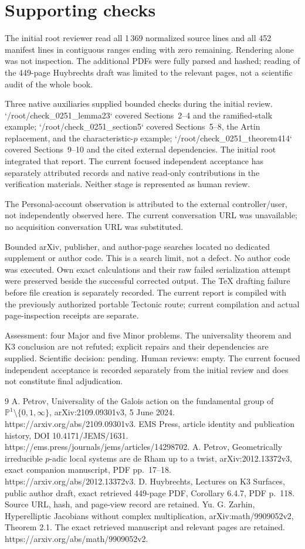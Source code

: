 \documentclass[10pt]{article}
\begin{document}
\section*{Supporting checks}
The initial root reviewer read all 1 369 normalized source lines and all 452 manifest lines in contiguous ranges ending with zero remaining. Rendering alone was not inspection. The additional PDFs were fully parsed and hashed; reading of the 449-page Huybrechts draft was limited to the relevant pages, not a scientific audit of the whole book.\par
Three native auxiliaries supplied bounded checks during the initial review. `/root/check\_0251\_lemma23` covered Sections 2–4 and the ramified-stalk example; `/root/check\_0251\_section5` covered Sections 5–8, the Artin replacement, and the characteristic-\(p\) example; `/root/check\_0251\_theorem414` covered Sections 9–10 and the cited external dependencies. The initial root integrated that report. The current focused independent acceptance has separately attributed records and native read-only contributions in the verification materials. Neither stage is represented as human review.\par
The Personal-account observation is attributed to the external controller/user, not independently observed here. The current conversation URL was unavailable; no acquisition conversation URL was substituted.\par
Bounded arXiv, publisher, and author-page searches located no dedicated supplement or author code. This is a search limit, not a defect. No author code was executed. Own exact calculations and their raw failed serialization attempt were preserved beside the successful corrected output. The TeX drafting failure before file creation is separately recorded. The current report is compiled with the previously authorized portable Tectonic route; current compilation and actual page-inspection receipts are separate.\par
Assessment: four Major and five Minor problems. The universality theorem and K3 conclusion are not refuted; explicit repairs and their dependencies are supplied. Scientific decision: pending. Human reviews: empty. The current focused independent acceptance is recorded separately from the initial review and does not constitute final adjudication.\par
9 A. Petrov, Universality of the Galois action on the fundamental group of \(\mathbb P^1\setminus\{0,1,\infty\}\), arXiv:2109.09301v3, 5 June 2024. https://arxiv.org/abs/2109.09301v3. EMS Press, article identity and publication history, DOI 10.4171/JEMS/1631. https://ems.press/journals/jems/articles/14298702. A. Petrov, Geometrically irreducible \(p\)-adic local systems are de Rham up to a twist, arXiv:2012.13372v3, exact companion manuscript, PDF pp. 17–18. https://arxiv.org/abs/2012.13372v3. D. Huybrechts, Lectures on K3 Surfaces, public author draft, exact retrieved 449-page PDF, Corollary 6.4.7, PDF p. 118. Source URL, hash, and page-view record are retained. Yu. G. Zarhin, Hyperelliptic Jacobians without complex multiplication, arXiv:math/9909052v2, Theorem 2.1. The exact retrieved manuscript and relevant pages are retained. https://arxiv.org/abs/math/9909052v2.\par
\end{document}
